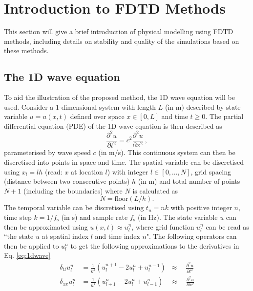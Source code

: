 \documentclass[dvipsnames, preprint]{JASA}
\begin{document}
\section{\label{sec:FDTD} Introduction to FDTD Methods}
This section will give a brief introduction of physical modelling using FDTD methods, including details on stability and quality of the simulations based on these methods.


\subsection{The 1D wave equation}
To aid the illustration of the proposed method, the 1D wave equation will be used. 
Consider a 1-dimensional system with length $L$ (in m) described by state variable $u = u(x, t)$ defined over space $x \in [0, L]$ and time $t \geq 0$. The partial differential equation (PDE) of the 1D wave equation is then described as
\begin{equation}\label{eq:1dwave}
    \frac{\partial^2 u}{\partial t^2}= c^2\frac{\partial^2 u}{\partial x^2}\ ,
\end{equation}
parameterised by wave speed $c$ (in m/s).
This continuous system can then be discretised into points in space and time. The spatial variable can be discretised using $x_l = lh$ (read: $x$ at location $l$) with integer $l \in [0, \hdots, N]$, grid spacing (distance between two consecutive points) $h$ (in m) and total number of points $N + 1$ (including the boundaries) where $N$ is calculated as 
\begin{equation}\label{eq:numberOfPoints}
    N = \text{floor}(L/h).
\end{equation}
The temporal variable can be discretised using $t_n = nk$ with positive integer $n$, time step $k = 1/f_\text{s}$ (in s) and sample rate $f_\text{s}$ (in Hz). The state variable $u$ can then be approximated using $u(x,t) \approx u_l^n$, where grid function $u_l^n$ can be read as ``the state $u$ at spatial index $l$ and time index $n$".
%
The following operators can then be applied to $u_l^n$ to get the following approximations to the derivatives in Eq. \eqref{eq:1dwave}
\begin{subequations}\label{eq:operators}
    \begin{align}
         \delta_{tt}u_l^n &= \frac{1}{k^2}\left(u_l^{n+1}-2u_l^n + u_l^{n-1}\right)\;\;\approx\quad\frac{\partial^2u}{\partial t^2}\label{eq:secondOrderTime}\\
         \delta_{xx}u_l^n &= \frac{1}{h^2}\left(u_{l+1}^n-2u_l^n + u_{l-1}^n\right)\quad\approx\quad \frac{\partial^2u}{\partial x^2}\label{eq:secondOrderSpace}
    \end{align}
\end{subequations}
\end{document}
